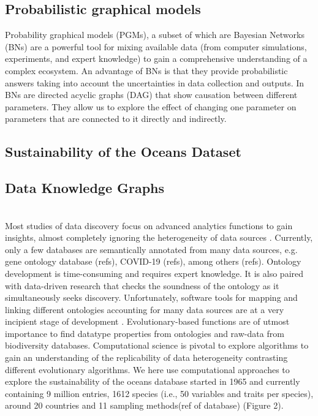 \documentclass[12pt,a4paper]{article}
\begin{document}
\subsection{Probabilistic graphical models}

Probability graphical models (PGMs), a subset of which are Bayesian Networks (BNs) are a powerful tool for mixing available data (from computer simulations, experiments, and expert knowledge) to gain a comprehensive understanding of a complex ecosystem. An advantage of BNs is that they provide probabilistic answers taking into account the uncertainties in data collection and outputs. In BNs are directed acyclic graphs (DAG) that show causation between different parameters. They allow us to explore the effect of changing one parameter on parameters that are connected to it directly and indirectly.

\subsection{Sustainability of the Oceans Dataset}



\subsection{Data Knowledge Graphs}
\\
Most studies of data discovery focus on advanced analytics functions to gain insights, almost completely ignoring the heterogeneity of data sources \citep{azeroual2019solving}. Currently, only a few databases are semantically annotated from many data sources, e.g. gene ontology database (refs), COVID-19 (refs), among others (refs). Ontology development is time-consuming and requires expert knowledge. It is also paired with data-driven research that checks the soundness of the ontology as it simultaneously seeks discovery. Unfortunately, software tools for mapping and linking different ontologies accounting for many data sources are at a very incipient stage of development \cite{nsf,KGcovid19,Oavida}. Evolutionary-based functions are of utmost importance to find datatype properties from ontologies and raw-data from biodiversity databases. Computational science is pivotal to explore algorithms to gain an understanding of the replicability of data heterogeneity contrasting different evolutionary algorithms. We here use computational approaches to explore the sustainability of the oceans database started in 1965 and currently containing 9 million entries, 1612 species (i.e., 50 variables and traits per species), around 20 countries and 11 sampling methods(ref of database) (Figure 2).
\end{document}
